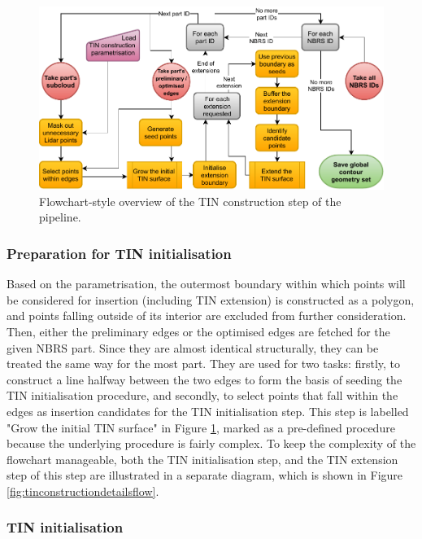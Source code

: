 \begin{figure}
    \centering
    \includegraphics[width=0.9\linewidth]{final_report/figs/tin_construction.pdf}
    \caption{Flowchart-style overview of the TIN construction step of the pipeline.}
    \label{fig:tinconstructionflow}
\end{figure}

\subsubsection{Preparation for TIN initialisation}

Based on the parametrisation, the outermost boundary within which points will be considered for insertion (including TIN extension) is constructed as a polygon, and points falling outside of its interior are excluded from further consideration. Then, either the preliminary edges or the optimised edges are fetched for the given NBRS part. Since they are almost identical structurally, they can be treated the same way for the most part. They are used for two tasks: firstly, to construct a line halfway between the two edges to form the basis of seeding the TIN initialisation procedure, and secondly, to select points that fall within the edges as insertion candidates for the TIN initialisation step. This step is labelled "Grow the initial TIN surface" in Figure \ref{fig:tinconstructionflow}, marked as a pre-defined procedure because the underlying procedure is fairly complex. To keep the complexity of the flowchart manageable, both the TIN initialisation step, and the TIN extension step of this step are illustrated in a separate diagram, which is shown in Figure \ref{fig:tinconstructiondetailsflow}.

\subsubsection{TIN initialisation}

